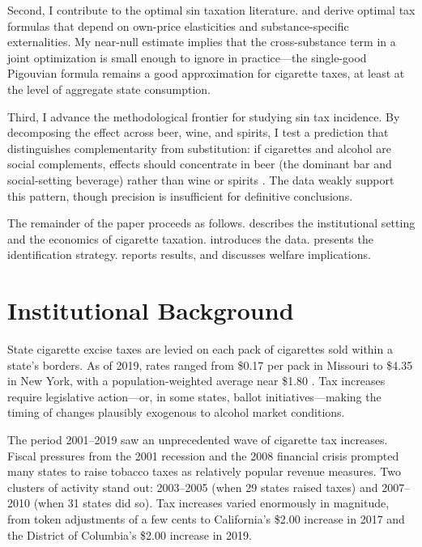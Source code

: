 \documentclass[12pt]{article}
\begin{document}
Second, I contribute to the optimal sin taxation literature. \citet{gruber2005sin} and \citet{allcott2019regressive} derive optimal tax formulas that depend on own-price elasticities and substance-specific externalities. My near-null estimate implies that the cross-substance term in a joint optimization is small enough to ignore in practice---the single-good Pigouvian formula remains a good approximation for cigarette taxes, at least at the level of aggregate state consumption.

Third, I advance the methodological frontier for studying sin tax incidence. By decomposing the effect across beer, wine, and spirits, I test a prediction that distinguishes complementarity from substitution: if cigarettes and alcohol are social complements, effects should concentrate in beer (the dominant bar and social-setting beverage) rather than wine or spirits \citep{carpenter2007heavy, cotti2016alcohol}. The data weakly support this pattern, though precision is insufficient for definitive conclusions.

The remainder of the paper proceeds as follows.  describes the institutional setting and the economics of cigarette taxation.  introduces the data.  presents the identification strategy.  reports results, and  discusses welfare implications.


\section{Institutional Background}
\label{sec:background}

State cigarette excise taxes are levied on each pack of cigarettes sold within a state's borders. As of 2019, rates ranged from \$0.17 per pack in Missouri to \$4.35 in New York, with a population-weighted average near \$1.80 \citep{gruber2001tobacco}. Tax increases require legislative action---or, in some states, ballot initiatives---making the timing of changes plausibly exogenous to alcohol market conditions.

The period 2001--2019 saw an unprecedented wave of cigarette tax increases. Fiscal pressures from the 2001 recession and the 2008 financial crisis prompted many states to raise tobacco taxes as relatively popular revenue measures. Two clusters of activity stand out: 2003--2005 (when 29 states raised taxes) and 2007--2010 (when 31 states did so). Tax increases varied enormously in magnitude, from token adjustments of a few cents to California's \$2.00 increase in 2017 and the District of Columbia's \$2.00 increase in 2019.
\end{document}
